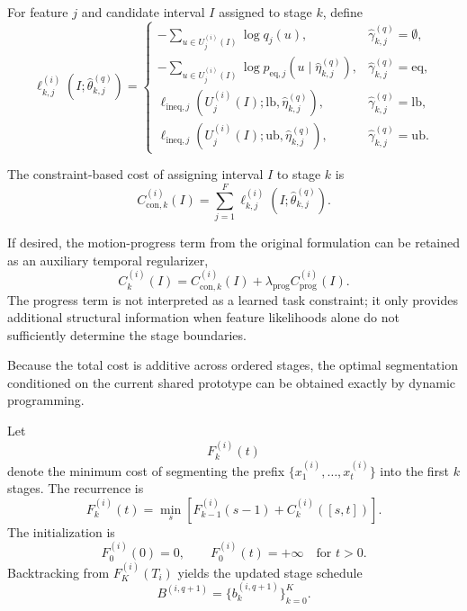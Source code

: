 \documentclass[lettersize,journal]{IEEEtran}
\begin{document}
For feature $j$ and candidate interval $I$ assigned to stage $k$, define
\[
\ell_{k,j}^{(i)}
\left(
I;
\widehat{\theta}_{k,j}^{(q)}
\right)
=
\begin{cases}
-\displaystyle\sum_{u\in U_j^{(i)}(I)}
\log q_j(u),
&
\widehat{\gamma}_{k,j}^{(q)}
=
\emptyset,
\\[4mm]
-\displaystyle\sum_{u\in U_j^{(i)}(I)}
\log
p_{\mathrm{eq},j}
\left(
u\mid
\widehat{\eta}_{k,j}^{(q)}
\right),
&
\widehat{\gamma}_{k,j}^{(q)}
=
\mathrm{eq},
\\[4mm]
\ell_{\mathrm{ineq},j}
\left(
U_j^{(i)}(I);
\mathrm{lb},
\widehat{\eta}_{k,j}^{(q)}
\right),
&
\widehat{\gamma}_{k,j}^{(q)}
=
\mathrm{lb},
\\[3mm]
\ell_{\mathrm{ineq},j}
\left(
U_j^{(i)}(I);
\mathrm{ub},
\widehat{\eta}_{k,j}^{(q)}
\right),
&
\widehat{\gamma}_{k,j}^{(q)}
=
\mathrm{ub}.
\end{cases}
\]

The constraint-based cost of assigning interval $I$ to stage $k$ is
\[
C_{\mathrm{con},k}^{(i)}(I)
=
\sum_{j=1}^{F}
\ell_{k,j}^{(i)}
\left(
I;
\widehat{\theta}_{k,j}^{(q)}
\right).
\]

If desired, the motion-progress term from the original formulation can be retained as an auxiliary temporal regularizer,
\[
C_k^{(i)}(I)
=
C_{\mathrm{con},k}^{(i)}(I)
+
\lambda_{\mathrm{prog}}
C_{\mathrm{prog}}^{(i)}(I).
\]
The progress term is not interpreted as a learned task constraint; it only provides additional structural information when feature likelihoods alone do not sufficiently determine the stage boundaries.

%
%

Because the total cost is additive across ordered stages, the optimal segmentation conditioned on the current shared prototype can be obtained exactly by dynamic programming.

Let
\[
F_k^{(i)}(t)
\]
denote the minimum cost of segmenting the prefix
$\{x_1^{(i)},\ldots,x_t^{(i)}\}$ into the first $k$ stages. The recurrence is
\[
F_k^{(i)}(t)
=
\min_{s}
\left[
F_{k-1}^{(i)}(s-1)
+
C_k^{(i)}([s,t])
\right].
\]
The initialization is
\[
F_0^{(i)}(0)=0,
\qquad
F_0^{(i)}(t)=+\infty
\quad
\text{for }t>0.
\]
Backtracking from $F_K^{(i)}(T_i)$ yields the updated stage schedule
\[
B^{(i,q+1)}
=
\{b_k^{(i,q+1)}\}_{k=0}^{K}.
\]
\end{document}
